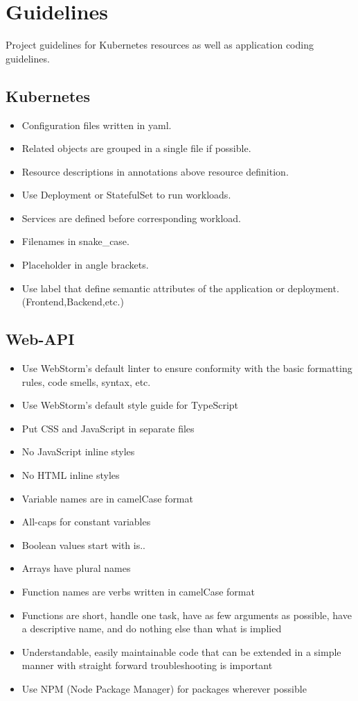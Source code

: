 \chapter{Guidelines}
Project guidelines for Kubernetes resources as well as application coding guidelines.

\section{Kubernetes}
\label{guidelines-kubernetes}
\begin{itemize}
    \item Configuration files written in yaml.
    \item Related objects are grouped in a single file if possible.
    \item Resource descriptions in annotations above resource definition.
    \item Use Deployment or StatefulSet to run workloads.
    \item Services are defined before corresponding workload.
    \item Filenames in snake\_case.
    \item Placeholder in angle brackets.
    \item Use label that define semantic attributes of the application or deployment. (Frontend,Backend,etc.)
\end{itemize}

\section{Web-API}
\label{guidelines-web-api}
\begin{itemize}
    \item Use WebStorm's default linter to ensure conformity with the basic formatting rules, code smells, syntax, etc.
    \item Use WebStorm's default style guide for TypeScript
    \item Put CSS and JavaScript in separate files
    \item No JavaScript inline styles
    \item No HTML inline styles
    \item Variable names are in camelCase format
    \item All-caps for constant variables
    \item Boolean values start with is..
    \item Arrays have plural names
    \item Function names are verbs written in camelCase format
    \item Functions are short, handle one task, have as few arguments as possible, have a descriptive name, and do nothing else than what is implied
    \item Understandable, easily maintainable code that can be extended in a simple manner with straight forward troubleshooting is important
    \item Use NPM (Node Package Manager) for packages wherever possible
\end{itemize}